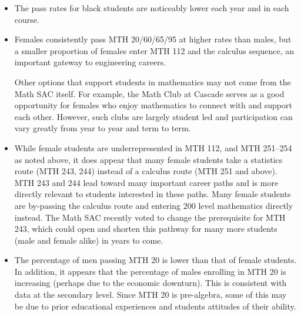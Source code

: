 \begin{itemize}
	some minority students or that minority students place into MTH 20 at a
	disproportionately high rate. Although this is relatively consistent with
	national data, we would like the administration to continue to support
	programs like Passages, Project Independence, ROOTS, and other interventions
	to increase success rates of
	minority students. In addition, a more diverse faculty might help with
	retention and passing rates; \emph{ the extent to which [the instructor's attributes]
		differ from the physical, cultural, and intellectual backgrounds of [his/her] students
		will have a profound effect on the interactions in [the] classroom.}
	\footnote{\url{http://www.crlt.umich.edu/gsis/p3_2}}
	\item The pass rates for black students are noticeably lower each year and
	in each course.

	\item Females consistently pass MTH 20/60/65/95 at higher rates than males,
	but a smaller proportion of females enter MTH 112 and the calculus
	sequence, an important gateway to engineering careers.


	Other options that support students in
	mathematics may not come from the Math SAC itself. For example, the Math
	Club at Cascade serves as a good opportunity for females who enjoy
	mathematics to connect with and support each other. However, such clubs
	are largely student led and participation can vary greatly from year to
	year and term to term.

	\item While female students are underrepresented in MTH 112, and MTH 251--254
	as noted above, it does appear that many female students take a statistics
	route (MTH 243, 244) instead of a calculus route (MTH 251 and above). MTH 243
	and 244 lead toward many important career paths and is more directly relevant
	to students interested in these paths. Many female students are by-passing
	the calculus route and entering 200 level mathematics directly instead. The
	Math SAC recently voted to change the prerequisite for MTH 243, which could
	open and shorten this pathway for many more students (male and female alike)
	in years to come.

	\item The percentage of men passing MTH 20 is lower than that of female
	students. In addition, it appears that the percentage of males enrolling
	in MTH 20 is increasing (perhaps due to the economic downturn). This is
	consistent with data at the secondary level. Since MTH 20 is pre-algebra,
	some of this may be due to prior educational experiences and students
	attitudes of their ability.
\end{itemize}

